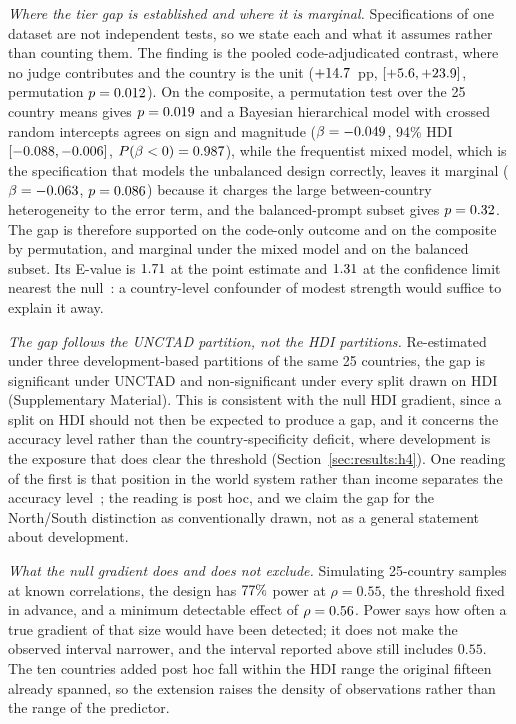 \emph{Where the tier gap is established and where it is marginal.}
Specifications of one dataset are not independent tests, so we state each and
what it assumes rather than counting them. The finding is the pooled
code-adjudicated contrast, where no judge contributes and the country is the
unit ($+14.7$~pp, $[+5.6,+23.9]$, permutation $p=0.012$). On the
composite, a permutation test over the 25 country means gives
$p=0.019$ and a Bayesian hierarchical model with crossed random
intercepts agrees on sign and magnitude ($\beta=-0.049$, 94\% HDI
$[-0.088,-0.006]$, $P(\beta<0)=0.987$), while the frequentist mixed
model, which is the specification that models the unbalanced design correctly,
leaves it marginal ($\beta=-0.063$, $p=0.086$) because it charges the
large between-country heterogeneity to the error term, and the balanced-prompt
subset gives $p=0.32$. The gap is therefore supported on the code-only
outcome and on the composite by permutation, and marginal under the mixed model
and on the balanced subset. Its E-value is $1.71$ at the point estimate and
$1.31$ at the confidence limit nearest the
null~\citep{vanderweele2017evalue}: a country-level confounder of modest
strength would suffice to explain it away.

\emph{The gap follows the UNCTAD partition, not the HDI partitions.}
Re-estimated under three development-based partitions of the same 25
countries, the gap is significant under UNCTAD and non-significant under every
split drawn on HDI (Supplementary Material). This is consistent with the null
HDI gradient, since a split on HDI should not then be expected to produce a
gap, and it concerns the accuracy level rather than the country-specificity
deficit, where development is the exposure that does clear the threshold
(Section~\ref{sec:results:h4}). One reading of the first is that position in
the world system rather than income separates the accuracy
level~\citep{quijano2000coloniality,mohamed2020decolonial}; the reading is post
hoc, and we claim the gap for the North/South distinction as conventionally
drawn, not as a general statement about development.

\emph{What the null gradient does and does not exclude.} Simulating 25-country
samples at known correlations, the design has $77\%$ power at
$\rho=0.55$, the threshold fixed in advance, and a minimum detectable effect
of $\rho=0.56$. Power says how often a true gradient of that size would have
been detected; it does not make the observed interval narrower, and the
interval reported above still includes $0.55$. The ten countries added post hoc
fall within the HDI range the original fifteen already spanned, so the
extension raises the density of observations rather than the range of the
predictor.

